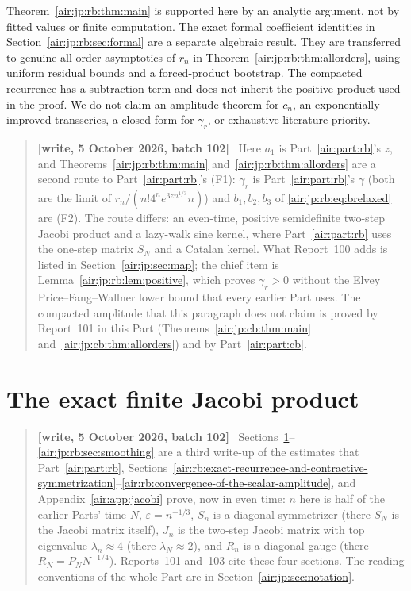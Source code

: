 \documentclass[11pt,letterpaper]{article}
\numberwithin{equation}{section}
\theoremstyle{remark}
\newcommand{\eps}{\varepsilon}
\newenvironment{writenotejp}{\par\smallskip\begin{quote}\small\textbf{[write, 5 October 2026, batch 102]}\ }{\end{quote}\smallskip}
\begin{document}
Theorem~\ref{air:jp:rb:thm:main} is supported here by an analytic argument, not by fitted values or finite computation. The exact formal coefficient identities in Section~\ref{air:jp:rb:sec:formal} are a separate algebraic result. They are transferred to genuine all-order asymptotics of $r_n$ in Theorem~\ref{air:jp:rb:thm:allorders}, using uniform residual bounds and a forced-product bootstrap. The compacted recurrence has a subtraction term and does not inherit the positive product used in the proof. We do not claim an amplitude theorem for $c_n$, an exponentially improved transseries, a closed form for $\gamma_r$, or exhaustive literature priority.
\begin{writenotejp}
Here $a_1$ is Part~\ref{air:part:rb}'s $z$, and Theorems~\ref{air:jp:rb:thm:main} and~\ref{air:jp:rb:thm:allorders} are a second route to Part~\ref{air:part:rb}'s (F1): $\gamma_r$ is Part~\ref{air:part:rb}'s $\gamma$ (both are the limit of $r_n/(n!4^ne^{3zn^{1/3}}n)$) and $b_1,b_2,b_3$ of \eqref{air:jp:rb:eq:brelaxed} are (F2). The route differs: an even-time, positive semidefinite two-step Jacobi product and a lazy-walk sine kernel, where Part~\ref{air:part:rb} uses the one-step matrix $S_N$ and a Catalan kernel. What Report~100 adds is listed in Section~\ref{air:jp:sec:map}; the chief item is Lemma~\ref{air:jp:rb:lem:positive}, which proves $\gamma_r>0$ without the Elvey Price--Fang--Wallner lower bound that every earlier Part uses. The compacted amplitude that this paragraph does not claim is proved by Report~101 in this Part (Theorems~\ref{air:jp:cb:thm:main} and~\ref{air:jp:cb:thm:allorders}) and by Part~\ref{air:part:cb}.
\end{writenotejp}

\section{The exact finite Jacobi product}\label{air:jp:rb:sec:jacobi}
\begin{writenotejp}
Sections~\ref{air:jp:rb:sec:jacobi}--\ref{air:jp:rb:sec:smoothing} are a third write-up of the estimates that Part~\ref{air:part:rb}, Sections~\ref{air:rb:exact-recurrence-and-contractive-symmetrization}--\ref{air:rb:convergence-of-the-scalar-amplitude}, and Appendix~\ref{air:app:jacobi} prove, now in even time: $n$ here is half of the earlier Parts' time $N$, $\eps=n^{-1/3}$, $S_n$ is a diagonal symmetrizer (there $S_N$ is the Jacobi matrix itself), $J_n$ is the two-step Jacobi matrix with top eigenvalue $\lambda_n\approx4$ (there $\lambda_N\approx2$), and $R_n$ is a diagonal gauge (there $R_N=P_NN^{-1/4}$). Reports~101 and~103 cite these four sections. The reading conventions of the whole Part are in Section~\ref{air:jp:sec:notation}.
\end{writenotejp}
\end{document}
